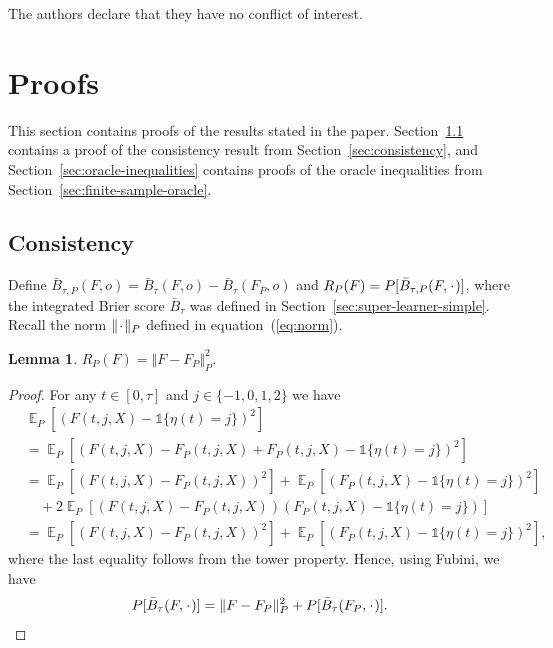 \documentclass[a4paper,danish]{article}
\theoremstyle{plain} %
\numberwithin{theorem}{section}
\newtheorem{lemma}[theorem]{Lemma}
\theoremstyle{definition} %
\theoremstyle{remark}
\DeclareMathOperator{\E}{\mathbb{E}} %
\newcommand{\blank}{\makebox[1ex]{\textbf{$\cdot$}}}
\newcommand{\1}{\mathds{1}}
\begin{document}
The authors declare that they have no conflict of interest.




\appendix

\section{Proofs}
\label{sec:proofs}

This section contains proofs of the results stated in the
paper. Section~\ref{sec:consistency-proof} contains a proof of
the consistency result from Section~\ref{sec:consistency}, and
Section~\ref{sec:oracle-inequalities} contains proofs of the
oracle inequalities from
Section~\ref{sec:finite-sample-oracle}.

\subsection{Consistency}
\label{sec:consistency-proof}

Define
\( \bar{B}_{\tau,P}(F, o) = \bar{B}_{\tau}(F, o) -
\bar{B}_{\tau}(F_P, o) \) and
\( R_{P}(F) = P{[\bar{B}_{\tau,P}(F, \blank)]} \), where the
integrated Brier score \( \bar{B}_{\tau} \) was defined in
Section~\ref{sec:super-learner-simple}. Recall the norm
\( \Vert \blank \Vert_{P}\) defined in
equation~(\ref{eq:norm}).

\begin{lemma}
  \label{lemma:norm}
  \( R_{P}(F) = \Vert F - F_P \Vert_{P}^2 \).
\end{lemma}
\begin{proof}[Proof]
  For any \( t \in [0, \tau] \) and \( j\in \{-1,0,1,2\} \) we have
  \begin{align*}
    & \E_{P}{\left[ (F(t, j, X) - \1{\{\eta(t) = j \}})^2 \right]}
    \\
    & =    \E_{P}{\left[ (F(t, j, X) - F_P(t, j, X) + F_P(t, j, X) - \1{\{\eta(t) = j
      \}})^2 \right]}
    \\
    & =    \E_{P}{\left[ (F(t, j, X) - F_P(t, j, X))^2\right]}
      + \E_{P}{\left[ (F_P(t, j, X) - \1{\{\eta(t) = j \}})^2\right]}
    \\
    & \quad
      + 2\E_{P}{\left[ (F(t, j, X) - F_P(t, j, X))(F_P(t, j, X) - \1{\{\eta(t) = j
      \}})\right]}
    \\
    & =    \E_{P}{\left[ (F(t, j, X) - F_P(t, j, X))^2\right]}
      + \E_{P}{\left[ (F_P(t, j, X) - \1{\{\eta(t) = j \}})^2\right]},
  \end{align*}
  where the last equality follows from the tower property. Hence, using Fubini,
  we have
  \begin{equation*}
    P{[\bar{B}_{\tau}(F, \blank)]}
    = \Vert F - F_P \Vert_{P}^2 + P{[\bar{B}_{\tau}(F_P, \blank)]}.
  \end{equation*}
\end{proof}
\end{document}
